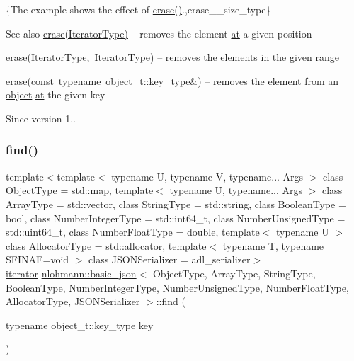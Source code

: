 \{The example shows the effect of {\ttfamily \mbox{\hyperlink{classnlohmann_1_1basic__json_a068a16e76be178e83da6a192916923ed}{erase()}}}.,erase\+\_\+\+\_\+size\+\_\+type\}

\begin{DoxySeeAlso}{See also}
\mbox{\hyperlink{classnlohmann_1_1basic__json_a068a16e76be178e83da6a192916923ed}{erase(\+Iterator\+Type)}} -- removes the element \mbox{\hyperlink{classnlohmann_1_1basic__json_a73ae333487310e3302135189ce8ff5d8}{at}} a given position 

\mbox{\hyperlink{classnlohmann_1_1basic__json_a4b3f7eb2d4625d95a51fbbdceb7c5f39}{erase(\+Iterator\+Type, Iterator\+Type)}} -- removes the elements in the given range 

\mbox{\hyperlink{classnlohmann_1_1basic__json_a2f8484d69c55d8f2a9697a7bec29362a}{erase(const typename object\+\_\+t\+::key\+\_\+type\&)}} -- removes the element from an \mbox{\hyperlink{classnlohmann_1_1basic__json_aa13f7c0615867542ce80337cbcf13ada}{object}} \mbox{\hyperlink{classnlohmann_1_1basic__json_a73ae333487310e3302135189ce8ff5d8}{at}} the given key
\end{DoxySeeAlso}
\begin{DoxySince}{Since}
version 1.. 
\end{DoxySince}
\mbox{\label{classnlohmann_1_1basic__json_aeed33787bd362c7ead59a4ba945392db}} 
\subsubsection{\texorpdfstring{find()}{find()}\hspace{0.1cm}{\footnotesize\ttfamily [1/2]}}
{\footnotesize\ttfamily template$<$template$<$ typename U, typename V, typename... Args $>$ class Object\+Type = std\+::map, template$<$ typename U, typename... Args $>$ class Array\+Type = std\+::vector, class String\+Type  = std\+::string, class Boolean\+Type  = bool, class Number\+Integer\+Type  = std\+::int64\+\_\+t, class Number\+Unsigned\+Type  = std\+::uint64\+\_\+t, class Number\+Float\+Type  = double, template$<$ typename U $>$ class Allocator\+Type = std\+::allocator, template$<$ typename T, typename S\+F\+I\+N\+A\+E=void $>$ class J\+S\+O\+N\+Serializer = adl\+\_\+serializer$>$ \\
\mbox{\hyperlink{classnlohmann_1_1basic__json_a099316232c76c034030a38faa6e34dca}{iterator}} \mbox{\hyperlink{classnlohmann_1_1basic__json}{nlohmann\+::basic\+\_\+json}}$<$ Object\+Type, Array\+Type, String\+Type, Boolean\+Type, Number\+Integer\+Type, Number\+Unsigned\+Type, Number\+Float\+Type, Allocator\+Type, J\+S\+O\+N\+Serializer $>$\+::find (\begin{DoxyParamCaption}\item[{typename object\+\_\+t\+::key\+\_\+type}]{key }\end{DoxyParamCaption})\hspace{0.3cm}{\ttfamily [inline]}}



